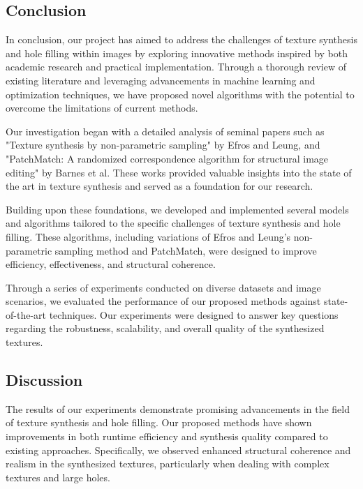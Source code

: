 \begin{conclusion}
    
    
\section{Conclusion}


In conclusion, our project has aimed to address the challenges of texture synthesis and hole filling within images by exploring innovative methods inspired by both academic research and practical implementation. Through a thorough review of existing literature and leveraging advancements in machine learning and optimization techniques, we have proposed novel algorithms with the potential to overcome the limitations of current methods.

Our investigation began with a detailed analysis of seminal papers such as "Texture synthesis by non-parametric sampling" by Efros and Leung, and "PatchMatch: A randomized correspondence algorithm for structural image editing" by Barnes et al. These works provided valuable insights into the state of the art in texture synthesis and served as a foundation for our research.

Building upon these foundations, we developed and implemented several models and algorithms tailored to the specific challenges of texture synthesis and hole filling. These algorithms, including variations of Efros and Leung's non-parametric sampling method and PatchMatch, were designed to improve efficiency, effectiveness, and structural coherence.

Through a series of experiments conducted on diverse datasets and image scenarios, we evaluated the performance of our proposed methods against state-of-the-art techniques. Our experiments were designed to answer key questions regarding the robustness, scalability, and overall quality of the synthesized textures.

\subsection{Discussion }

The results of our experiments demonstrate promising advancements in the field of texture synthesis and hole filling. Our proposed methods have shown improvements in both runtime efficiency and synthesis quality compared to existing approaches. Specifically, we observed enhanced structural coherence and realism in the synthesized textures, particularly when dealing with complex textures and large holes.


\end{conclusion}
